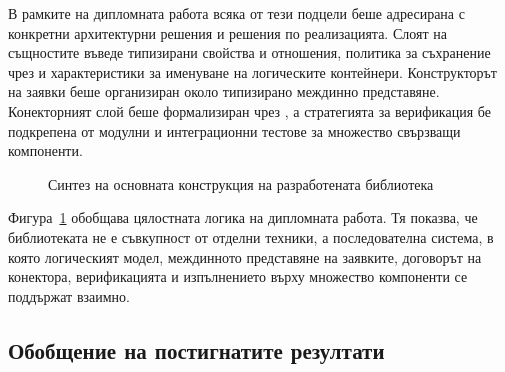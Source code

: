 В рамките на дипломната работа всяка от тези подцели беше адресирана с конкретни архитектурни решения и решения по реализацията. Слоят на същностите въведе типизирани свойства и отношения, политика за съхранение чрез  и характеристики за именуване на логическите контейнери. Конструкторът на заявки беше организиран около типизирано междинно представяне. Конекторният слой беше формализиран чрез , а стратегията за верификация бе подкрепена от модулни и интеграционни тестове за множество свързващи компоненти.

\begin{figure}[H]
\centering
{}
\caption{Синтез на основната конструкция на разработената библиотека}
\label{fig:thesis_synthesis}
\end{figure}

Фигура~\ref{fig:thesis_synthesis} обобщава цялостната логика на дипломната работа. Тя показва, че библиотеката не е съвкупност от отделни техники, а последователна система, в която логическият модел, междинното представяне на заявките, договорът на конектора, верификацията и изпълнението върху множество компоненти се поддържат взаимно.

\subsection{Обобщение на постигнатите резултати}


